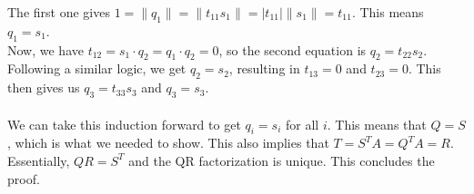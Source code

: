 \documentclass[11pt,onecolumn]{article}
\begin{document}
The first one gives \( 1 = \|q_1\| = \|t_{11} s_1\| = |t_{11}| \|s_1\| = t_{11} \). This means \( q_1 = s_1 \).
\\
Now, we have \( t_{12} = s_1 \cdot q_2 = q_1 \cdot q_2 = 0 \), so the second equation is \( q_2 = t_{22} s_2 \). Following a similar logic, we get \( q_2 = s_2 \), resulting in \( t_{13} = 0 \) and \( t_{23} = 0 \). This then gives us \( q_3 = t_{33} s_3 \) and \( q_3 = s_3 \).
\\
\vspace{1pt}
\\
We can take this induction forward to get \( q_i = s_i \) for all \( i \). This means that \( Q = S \), which is what we needed to show. This also implies that \( T = S^T A = Q^T A = R \). Essentially, \( QR = S^T \) and the QR factorization is unique. This concludes the proof.
\end{document}

